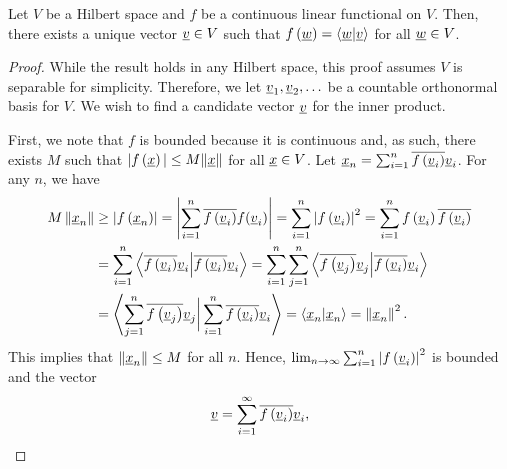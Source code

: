 \begin{theorem}[Riesz] \label{theorem:FunctionalInnerProduct}
Let $V$ be a Hilbert space and $f$ be a continuous linear functional on $V$.
Then, there exists a unique vector $\underline{v} \in V$ such that $f \left( \underline{w} \right) = \left\langle \underline{w} | \underline{v} \right\rangle$ for all $\underline{w} \in V$.
\end{theorem}
\begin{proof}
While the result holds in any Hilbert space, this proof assumes $V$ is separable for simplicity.
Therefore, we let $\underline{v}_1, \underline{v}_2, \ldots$ be a countable orthonormal basis for $V$.
We wish to find a candidate vector $\underline{v}$ for the inner product.

First, we note that $f$ is bounded because it is continuous and, as such, there exists $M$ such that $| f \left( \underline{x} \right) | \leq M \| \underline{x} \|$ for all $\underline{x} \in V$.
Let $\underline{x}_n = \sum_{i=1}^n \overline{ f \left( \underline{v}_i \right) } \underline{v}_i$.
For any $n$, we have
\begin{equation*}
\begin{split}
M \left\| \underline{x}_n \right\| &\geq \left| f \left( \underline{x}_n \right) \right|
= \left| \sum_{i=1}^n \overline{ f \left( \underline{v}_i \right) } f(\underline{v}_i) \right|
= \sum_{i=1}^n \left| f \left( \underline{v}_i \right) \right|^2
= \sum_{i=1}^n f \left( \underline{v}_i \right)
\overline{ f \left( \underline{v}_i \right) } \\
&= \sum_{i=1}^n \left\langle \overline{ f \left( \underline{v}_i \right) } \underline{v}_i
\Big| \overline{ f \left( \underline{v}_i \right) } \underline{v}_i \right\rangle
= \sum_{i=1}^n \sum_{j=1}^n
\left\langle \overline{ f \left( \underline{v}_j \right) } \underline{v}_j
\Big| \overline{ f \left( \underline{v}_i \right) } \underline{v}_i \right\rangle \\
&= \left\langle \sum_{j=1}^n
\overline{ f \left( \underline{v}_j \right) } \underline{v}_j
\bigg| \sum_{i=1}^n
\overline{ f \left( \underline{v}_i \right) } \underline{v}_i \right\rangle
= \left\langle \underline{x}_n | \underline{x}_n \right\rangle
= \left\| \underline{x}_n \right\|^2 .
\end{split}
\end{equation*}
This implies that $\| \underline{x}_n \| \leq M$ for all $n$.
Hence, $\lim_{n \rightarrow \infty} \sum_{i=1}^n \left| f \left( \underline{v}_i \right) \right|^2$ is bounded and the vector
\begin{equation*}
\vecnot{v} = \sum_{i=1}^{\infty} \overline{ f \left( \vecnot{v}_i \right) } \vecnot{v}_i ,

\end{equation*}
\end{proof}
